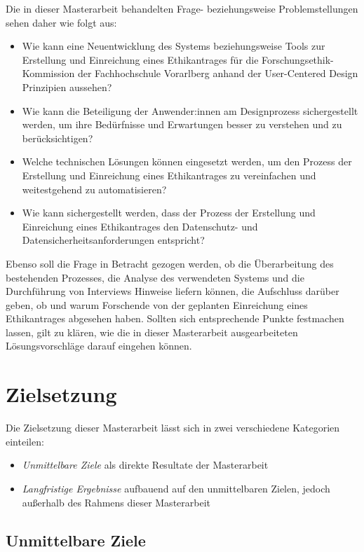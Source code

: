 \documentclass[a4paper,12pt,twoside]{scrreprt}
\begin{document}
Die in dieser Masterarbeit behandelten Frage- beziehungsweise Problemstellungen sehen daher wie folgt aus:
\begin{itemize}
    \item Wie kann eine Neuentwicklung des Systems beziehungsweise Tools zur Erstellung und Einreichung eines Ethikantrages für die Forschungsethik-Kommission der Fachhochschule Vorarlberg anhand der User-Centered Design Prinzipien aussehen?
    \item Wie kann die Beteiligung der Anwender:innen am Designprozess sichergestellt werden, um ihre Bedürfnisse und Erwartungen besser zu verstehen und zu berücksichtigen?
    \item Welche technischen Lösungen können eingesetzt werden, um den Prozess der Erstellung und Einreichung eines Ethikantrages zu vereinfachen und weitestgehend zu automatisieren?
    \item Wie kann sichergestellt werden, dass der Prozess der Erstellung und Einreichung eines Ethikantrages den Datenschutz- und Datensicherheitsanforderungen entspricht?
\end{itemize}

Ebenso soll die Frage in Betracht gezogen werden, ob die Überarbeitung des bestehenden Prozesses, die Analyse des verwendeten Systems und die Durchführung von Interviews Hinweise liefern können, die Aufschluss darüber geben, ob und warum Forschende von der geplanten Einreichung eines Ethikantrages abgesehen haben. Sollten sich entsprechende Punkte festmachen lassen, gilt zu klären, wie die in dieser Masterarbeit ausgearbeiteten Lösungsvorschläge darauf eingehen können.

\section{Zielsetzung}
\label{sec:zielsetzung}

Die Zielsetzung dieser Masterarbeit lässt sich in zwei verschiedene Kategorien einteilen:
\begin{itemize}
    \item \textit{Unmittelbare Ziele} als direkte Resultate der Masterarbeit
    \item \textit{Langfristige Ergebnisse} aufbauend auf den unmittelbaren Zielen, jedoch außerhalb des Rahmens dieser Masterarbeit
\end{itemize}

\subsection{Unmittelbare Ziele}
\label{sub-sec:unmittelbare-ziele}
\end{document}
